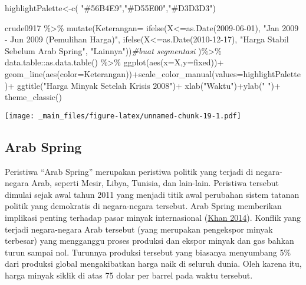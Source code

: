 \documentclass[
]{book}
\newenvironment{Shaded}{\begin{snugshade}}{\end{snugshade}}
\newcommand{\AttributeTok}[1]{\textcolor[rgb]{0.77,0.63,0.00}{#1}}
\newcommand{\CommentTok}[1]{\textcolor[rgb]{0.56,0.35,0.01}{\textit{#1}}}
\newcommand{\FunctionTok}[1]{\textcolor[rgb]{0.00,0.00,0.00}{#1}}
\newcommand{\NormalTok}[1]{#1}
\newcommand{\OtherTok}[1]{\textcolor[rgb]{0.56,0.35,0.01}{#1}}
\newcommand{\SpecialCharTok}[1]{\textcolor[rgb]{0.00,0.00,0.00}{#1}}
\newcommand{\StringTok}[1]{\textcolor[rgb]{0.31,0.60,0.02}{#1}}
\begin{document}
\begin{Shaded}
\begin{Highlighting}[]
\NormalTok{highlightPalette}\OtherTok{\textless{}{-}}\FunctionTok{c}\NormalTok{( }\StringTok{"\#56B4E9"}\NormalTok{,}\StringTok{"\#D55E00"}\NormalTok{,}\StringTok{"\#D3D3D3"}\NormalTok{)}

\NormalTok{crude0917 }\SpecialCharTok{\%\textgreater{}\%}
  \FunctionTok{mutate}\NormalTok{(}\AttributeTok{Keterangan=}
          \FunctionTok{ifelse}\NormalTok{(X}\SpecialCharTok{\textless{}=}\FunctionTok{as.Date}\NormalTok{(}\StringTok{\textquotesingle{}2009{-}06{-}01\textquotesingle{}}\NormalTok{),}
                 \StringTok{"Jan 2009 {-} Jun 2009 (Pemulihan Harga)"}\NormalTok{,}
          \FunctionTok{ifelse}\NormalTok{(X}\SpecialCharTok{\textless{}=}\FunctionTok{as.Date}\NormalTok{(}\StringTok{\textquotesingle{}2010{-}12{-}17\textquotesingle{}}\NormalTok{),}
                 \StringTok{"Harga Stabil Sebelum Arab Spring"}\NormalTok{,}
                  \StringTok{"Lainnya"}\NormalTok{))}\CommentTok{\#buat segmentasi }
\NormalTok{  )}\SpecialCharTok{\%\textgreater{}\%}\NormalTok{ data.table}\SpecialCharTok{::}\FunctionTok{as.data.table}\NormalTok{() }\SpecialCharTok{\%\textgreater{}\%}
  \FunctionTok{ggplot}\NormalTok{(}\FunctionTok{aes}\NormalTok{(}\AttributeTok{x=}\NormalTok{X,}\AttributeTok{y=}\NormalTok{fixed))}\SpecialCharTok{+}
  \FunctionTok{geom\_line}\NormalTok{(}\FunctionTok{aes}\NormalTok{(}\AttributeTok{color=}\NormalTok{Keterangan))}\SpecialCharTok{+}\FunctionTok{scale\_color\_manual}\NormalTok{(}\AttributeTok{values=}\NormalTok{highlightPalette)}\SpecialCharTok{+}
  \FunctionTok{ggtitle}\NormalTok{(}\StringTok{"Harga Minyak Setelah Krisis 2008"}\NormalTok{)}\SpecialCharTok{+}
  \FunctionTok{xlab}\NormalTok{(}\StringTok{"Waktu"}\NormalTok{)}\SpecialCharTok{+}\FunctionTok{ylab}\NormalTok{(}\StringTok{" "}\NormalTok{)}\SpecialCharTok{+}
  \FunctionTok{theme\_classic}\NormalTok{()}
\end{Highlighting}
\end{Shaded}

\texttt{[image: \_main\_files/figure-latex/unnamed-chunk-19-1.pdf]}

\hypertarget{arab-spring}{%
\subsection{Arab Spring}\label{arab-spring}}

Peristiwa ``Arab Spring'' merupakan peristiwa politik yang terjadi di negara-negara Arab, seperti Mesir, Libya, Tunisia, dan lain-lain. Peristiwa tersebut dimulai sejak awal tahun 2011 yang menjadi titik awal perubahan sistem tatanan politik yang demokratis di negara-negara tersebut. Arab Spring memberikan implikasi penting terhadap pasar minyak internasional (\protect\hyperlink{ref-khan_economic_2014}{Khan 2014}). Konflik yang terjadi negara-negara Arab tersebut (yang merupakan pengekspor minyak terbesar) yang mengganggu proses produksi dan ekspor minyak dan gas bahkan turun sampai nol. Turunnya produksi tersebut yang biasanya menyumbang 5\% dari produksi global mengakibatkan harga naik di seluruh dunia. Oleh karena itu, harga minyak siklik di atas 75 dolar per barrel pada waktu tersebut.
\end{document}
